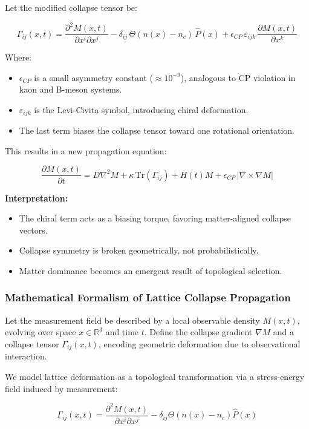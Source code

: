 Let the modified collapse tensor be:

\[
\Gamma_{ij}(x, t) = \frac{\partial^2 M(x, t)}{\partial x^i \partial x^j}
- \delta_{ij} \, \Theta(n(x) - n_c) \, \hat{P}(x)
+ \epsilon_{CP} \, \varepsilon_{ijk} \, \frac{\partial M(x, t)}{\partial x^k}
\]

Where:
\begin{itemize}
  \item $\epsilon_{CP}$ is a small asymmetry constant ($\approx 10^{-9}$), analogous to CP violation in kaon and B-meson systems.
  \item $\varepsilon_{ijk}$ is the Levi-Civita symbol, introducing chiral deformation.
  \item The last term biases the collapse tensor toward one rotational orientation.
\end{itemize}

This results in a new propagation equation:

\[
\frac{\partial M(x,t)}{\partial t}
= D \nabla^2 M + \kappa \, \text{Tr}(\Gamma_{ij})
+ H(t) M + \epsilon_{CP} \, \left| \nabla \times \nabla M \right|
\]

\textbf{Interpretation:}
\begin{itemize}
  \item The chiral term acts as a biasing torque, favoring matter-aligned collapse vectors.
  \item Collapse symmetry is broken geometrically, not probabilistically.
  \item Matter dominance becomes an emergent result of topological selection.
\end{itemize}

\subsubsection{Mathematical Formalism of Lattice Collapse Propagation}

Let the measurement field be described by a local observable density $M(x, t)$, evolving over space $x \in \mathbb{R}^3$ and time $t$. Define the collapse gradient $\nabla M$ and a collapse tensor $\Gamma_{ij}(x, t)$, encoding geometric deformation due to observational interaction.

We model lattice deformation as a topological transformation via a stress-energy field induced by measurement:

\[
\Gamma_{ij}(x, t) = \frac{\partial^2 M(x, t)}{\partial x^i \partial x^j} - \delta_{ij} \Theta(n(x) - n_c) \hat{P}(x)
\]


